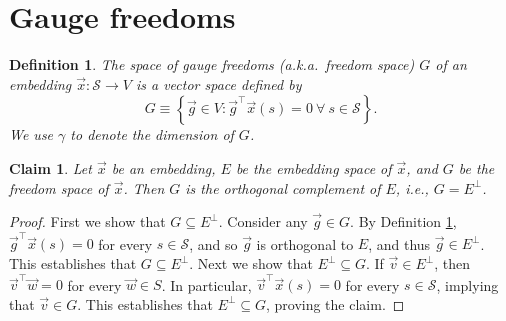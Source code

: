 \documentclass{article}
\numberwithin{myclaim}{section}
\newcommand{\set}[1]{\left\{ #1 \right\}}
\newtheorem{claim}{Claim}
\newtheorem{definition}{Definition}
\begin{document}
\section{Gauge freedoms}

\begin{definition} \label{def:freedom_space}
The space of gauge freedoms (a.k.a.\ freedom space) $G$ of an embedding $\vec{x}:\mathcal{S} \to V$ is a vector space defined by
\begin{equation}G \equiv \set{\vec{g} \in V: \vec{g}^\top \vec{x}(s) = 0\ \forall\ s \in \mathcal{S}}.    
\end{equation}
We use $\gamma$ to denote the dimension of $G$.
\end{definition}

\begin{claim}
    Let $\vec{x}$ be an embedding, $E$ be the embedding space of $\vec{x}$, and $G$ be the freedom space of $\vec{x}$. Then $G$ is the orthogonal complement of $E$, i.e., $G = E^\perp$.
\end{claim}
\begin{proof}
First we show that $G \subseteq E^\perp$. Consider any $\vec{g} \in G$. By Definition \ref{def:freedom_space}, $\vec{g}^\top \vec{x}(s) = 0$ for every $s \in \mathcal{S}$, and so $\vec{g}$ is orthogonal to $E$, and thus $\vec{g} \in E^\perp$. This establishes that $G \subseteq E^\perp$.  Next we show that $E^\perp \subseteq G$. If $\vec{v} \in E^\perp$, then $\vec{v}^\top \vec{w} = 0$ for every $\vec{w} \in S$. In particular, $\vec{v}^\top \vec{x}(s) = 0$ for every $s \in \mathcal{S}$, implying that $\vec{v} \in G$. This establishes that $E^\perp \subseteq G$, proving the claim. 
\end{proof}
\end{document}
